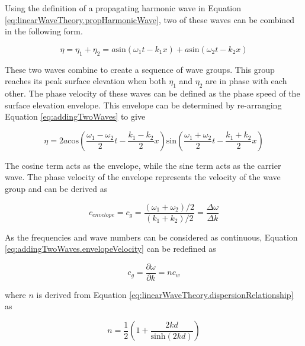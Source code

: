 Using the definition of a propagating harmonic wave in Equation \ref{eq:linearWaveTheory.propHarmonicWave}, two of these waves can be combined in the following form.

\begin{equation} \label{eq:addingTwoWaves}
    \eta = \eta_{1} + \eta_{2} = a\text{sin}(\omega_{1}t - k_{1}x) + a\text{sin}(\omega_{2}t - k_{2}x)
\end{equation}

These two waves combine to create a sequence of wave groups. This group reaches its peak surface elevation when both $\eta_{1}$ and $\eta_{2}$ are in phase with each other. The phase velocity of these waves can be defined as the phase speed of the surface elevation envelope. This envelope can be determined by re-arranging Equation \ref{eq:addingTwoWaves} to give

\begin{equation} \label{eq:addingTwoWaves.envelopeForm}
    \eta =  2a\text{cos} \left ( \frac{\omega_{1} - \omega_{2}}{2}t - \frac{k_{1} - k_{2}}{2}x \right ) \text{sin} \left ( \frac{\omega_{1} + \omega_{2}}{2}t - \frac{k_{1} + k_{2}}{2}x  \right )
\end{equation}

The cosine term acts as the envelope, while the sine term acts as the carrier wave. The phase velocity of the envelope represents the velocity of the wave group and can be derived as

\begin{equation} \label{eq:addingTwoWaves.envelopeVelocity}
    c_{envelope} = c_{g} = \frac{(\omega_{1} + \omega_{2})/2}{(k_1 + k_2)/2} = \frac{\Delta \omega}{\Delta k}
\end{equation}

As the frequencies and wave numbers can be considered as continuous, Equation \ref{eq:addingTwoWaves.envelopeVelocity} can be redefined as

\begin{equation} \label{eq:addingTwoWaves.groupVelocity}
    c_{g} = \frac{\partial \omega}{\partial k} = nc_{w}
\end{equation}

where $n$ is derived from Equation \ref{eq:linearWaveTheory.dispersionRelationship} as 

\begin{equation} \label{eq:addingTwoWaves.n}
    n = \frac{1}{2} \left ( 1+ \frac{2kd}{\text{sinh}(2kd)} \right )
\end{equation}

